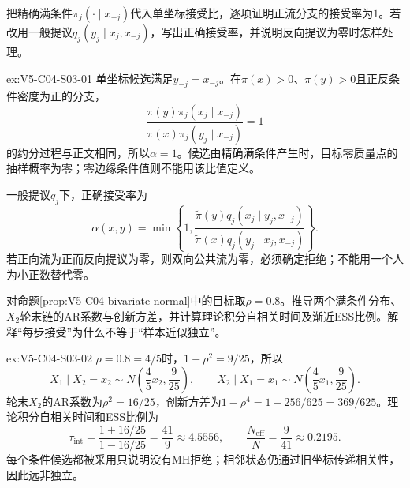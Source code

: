 \begin{SLChapterExercisePairSection}
\begin{exercise}\label{ex:V5-C04-S03-01}
把精确满条件$\pi_j(\cdot\mid x_{-j})$代入单坐标\MetropolisHastings{}接受比，逐项证明正流分支的接受率为$1$。若改用一般提议$q_j(y_j\mid x_j,x_{-j})$，写出正确接受率，并说明反向提议为零时怎样处理。
\end{exercise}
\ifSLFullEdition
{}\label{sol:V5-C04-S03-01}
\begin{chapterexercisesolution}{ex:V5-C04-S03-01}
单坐标候选满足$y_{-j}=x_{-j}$。在$\pi(x)>0$、$\pi(y)>0$且正反条件密度为正的分支，
\[
\frac{\pi(y)\pi_j(x_j\mid x_{-j})}
{\pi(x)\pi_j(y_j\mid x_{-j})}=1
\]
的约分过程与正文相同，所以$\alpha=1$。候选由精确满条件产生时，目标零质量点的抽样概率为零；零边缘条件值则不能用该比值定义。

一般提议$q_j$下，正确接受率为
\[
\alpha(x,y)=\min\!\left\{1,
\frac{\widetilde\pi(y)
q_j(x_j\mid y_j,x_{-j})}
{\widetilde\pi(x)
q_j(y_j\mid x_j,x_{-j})}\right\}.
\]
若正向流为正而反向提议为零，则双向公共流为零，必须确定拒绝；不能用一个人为小正数替代零。
\end{chapterexercisesolution}
\fi

\begin{exercise}\label{ex:V5-C04-S03-02}
对命题\ref{prop:V5-C04-bivariate-normal}中的目标取$\rho=0.8$。推导两个满条件分布、$X_2$轮末链的AR系数与创新方差，并计算理论积分自相关时间及渐近ESS比例。解释“每步接受”为什么不等于“样本近似独立”。
\end{exercise}
\ifSLFullEdition
{}\label{sol:V5-C04-S03-02}
\begin{chapterexercisesolution}{ex:V5-C04-S03-02}
$\rho=0.8=4/5$时，$1-\rho^2=9/25$，所以
\[
X_1\mid X_2=x_2\sim N\!\left(\frac45x_2,\frac9{25}\right),
\qquad
X_2\mid X_1=x_1\sim N\!\left(\frac45x_1,\frac9{25}\right).
\]
轮末$X_2$的AR系数为$\rho^2=16/25$，创新方差为$1-\rho^4=1-256/625=369/625$。理论积分自相关时间和ESS比例为
\[
\tau_{\mathrm{int}}
=\frac{1+16/25}{1-16/25}=\frac{41}{9}\approx4.5556,
\qquad
\frac{N_{\mathrm{eff}}}{N}=\frac9{41}\approx0.2195.
\]
每个条件候选都被采用只说明没有MH拒绝；相邻状态仍通过旧坐标传递相关性，因此远非独立。
\end{chapterexercisesolution}
\fi


\end{SLChapterExercisePairSection}
